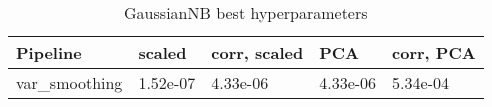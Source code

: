 \begin{table}[!htb]
\caption{GaussianNB best hyperparameters}
\label{table-gaussiannb-params}
\centering
\begin{tabular}{lllll}
\toprule
Pipeline & scaled & corr, scaled & PCA & corr, PCA \\
\midrule
var\_smoothing & 1.52e-07 & 4.33e-06 & 4.33e-06 & 5.34e-04 \\
\bottomrule
\end{tabular}
\end{table}
